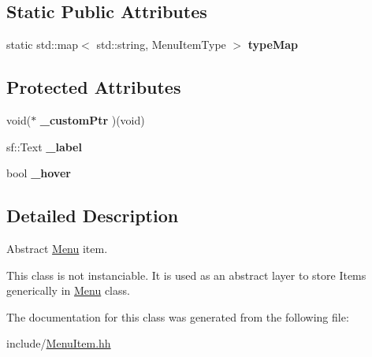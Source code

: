 \subsection*{Static Public Attributes}
\begin{DoxyCompactItemize}
\item 
static std\+::map$<$ std\+::string, Menu\+Item\+Type $>$ {\bfseries type\+Map}\hypertarget{classMenuItem_ad25a8c119e29e1bf12919306ff54ecfb}{}\label{classMenuItem_ad25a8c119e29e1bf12919306ff54ecfb}

\end{DoxyCompactItemize}
\subsection*{Protected Attributes}
\begin{DoxyCompactItemize}
\item 
void($\ast$ {\bfseries \+\_\+custom\+Ptr} )(void)\hypertarget{classMenuItem_a227fb312df48a97c616645b6a228794a}{}\label{classMenuItem_a227fb312df48a97c616645b6a228794a}

\item 
sf\+::\+Text {\bfseries \+\_\+label}\hypertarget{classMenuItem_ab0215e2c749d101cc1f3bda0801228c5}{}\label{classMenuItem_ab0215e2c749d101cc1f3bda0801228c5}

\item 
bool {\bfseries \+\_\+hover}\hypertarget{classMenuItem_a817ea1eb3f4ff7a63378e0ea77df0965}{}\label{classMenuItem_a817ea1eb3f4ff7a63378e0ea77df0965}

\end{DoxyCompactItemize}


\subsection{Detailed Description}
Abstract \hyperlink{classMenu}{Menu} item. 

This class is not instanciable. It is used as an abstract layer to store Items generically in \hyperlink{classMenu}{Menu} class. 

The documentation for this class was generated from the following file\+:\begin{DoxyCompactItemize}
\item 
include/\hyperlink{MenuItem_8hh}{Menu\+Item.\+hh}\end{DoxyCompactItemize}

